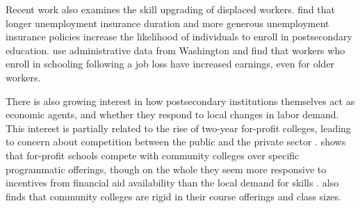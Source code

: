 Recent work  also examines the skill upgrading of displaced workers. \citet{BT2015} find that longer unemployment insurance duration and more generous unemployment insurance policies increase the likelihood of individuals to enroll in postsecondary education. \citet{JLS2005b, JLS2005a} use administrative data from Washington and find that workers who enroll in schooling following a job loss have increased earnings, even for older workers. 

There is also growing interest in how postsecondary institutions themselves act as economic agents, and whether they respond to local changes in labor demand. This interest is partially related to the rise of  two-year for-profit colleges, leading to concern about competition between the public and the private sector \citep{DGK2012, Cellini2009, Cellini2010}. \citet{Xia2016} shows that for-profit schools compete with community colleges over specific programmatic offerings, though on the whole they seem more responsive to incentives from financial aid availability than the local demand for skills \citep{Cellini2010b}. \citet{Xia2016} also finds that community colleges are rigid in their course offerings and class  sizes.

